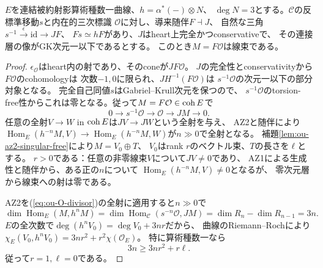 \begin{proposition}[曲線上の反標準制限のrank認識]
\label{prop:ou-reduced-curve-rank}
$E$を連結被約射影算術種数一曲線、$h=\alpha^*(-)\otimes N$、
$\deg N=3$とする。$\mathcal C$の反標準移動$s$と内在的三次標識
$\mathcal O$に対し、導来随伴$F\dashv J$、
自然な三角$s^{-1}\xrightarrow{\epsilon}\mathrm{id}\to JF$、
$Fs\simeq hF$があり、$J$はheart上完全かつconservativeで、
その連接層の像がGK次元一以下であるとする。
このとき$M=F\mathcal O$は線束である。
\end{proposition}
\begin{proof}
$\epsilon_{\mathcal O}$はheart内の射であり、そのconeが$JF\mathcal O$。
$J$の完全性とconservativityから$F\mathcal O$のcohomologyは
次数$-1,0$に限られ、$JH^{-1}(F\mathcal O)$は
$s^{-1}\mathcal O$の次元一以下の部分対象となる。
完全自己同値$s$はGabriel--Krull次元を保つので、
$s^{-1}\mathcal O$のtorsion-free性からこれは零となる。従って$M=F\mathcal O\in\operatorname{coh} E$で
\begin{equation}\label{eq:ou-O-divisor}
 0\to s^{-1}\mathcal O\to\mathcal O\to JM\to0.
\end{equation}
任意の全射$V\to W$ in $\operatorname{coh} E$は$JV\to JW$という全射を与え、
AZ2と随伴により$\operatorname{Hom}_E(h^{-n}M,V)\to
\operatorname{Hom}_E(h^{-n}M,W)$が$n\gg0$で全射となる。
補題\ref{lem:ou-az2-singular-free}により$M=V_0\oplus T$、
$V_0$はrank $r$のベクトル束、$T$の長さを$\ell$とする。
$r>0$である：任意の非零線束$V$について$JV\ne0$であり、
AZ1による生成性と随伴から、ある正の$n$について
$\operatorname{Hom}_E(h^{-n}M,V)\ne0$となるが、
零次元層から線束への射は零である。

AZ2を(\ref{eq:ou-O-divisor})の全射に適用すると$n\gg0$で
\[
 \dim\operatorname{Hom}_E(M,h^nM)
 =\dim\operatorname{Hom}_{\mathcal C}(s^{-n}\mathcal O,JM)
 =\dim R_n-\dim R_{n-1}=3n .
\]
$E$の全次数で$\deg(h^nV_0)=\deg V_0+3nr$だから、
曲線のRiemann--Rochにより
$\chi_E(V_0,h^nV_0)=3nr^2+r^2\chi(\mathcal O_E)$。
特に算術種数一なら
\[
 3n\geq 3nr^2+r\ell.
\]
従って$r=1,\ell=0$である。
\end{proof}

